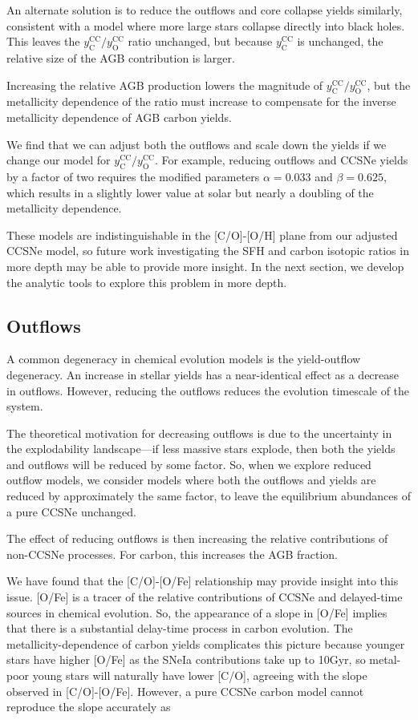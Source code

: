 \documentclass[fleqn,usenatbib]{mnras}
\begin{document}
An alternate solution is to reduce the outflows and core collapse yields similarly, consistent with a model where more large stars collapse directly into black holes. This leaves the $y_\text{C}^\text{CC}/y_\text{O}^\text{CC}$ ratio unchanged, but because $y_\text{C}^\text{CC}$ is unchanged, the relative size of the AGB contribution is larger. 


Increasing the relative AGB production lowers the magnitude of  $y_\text{C}^\text{CC}/y_\text{O}^\text{CC}$, but the metallicity dependence of the ratio must increase to compensate for the inverse metallicity dependence of AGB carbon yields. 

We find that we can adjust both the outflows and scale down the yields if we change our model for $y_\text{C}^\text{CC}/y_\text{O}^\text{CC}$. For example, reducing outflows and CCSNe yields by a factor of two requires the modified parameters
$\alpha = 0.033$ and $\beta = 0.625$, which results in a slightly lower value at solar but nearly a doubling of the metallicity dependence.

These models are indistinguishable in the [C/O]-[O/H] plane from our adjusted CCSNe model, so future work investigating the SFH and carbon isotopic ratios in more depth may be able to provide more insight. In the next section, we develop the analytic tools to explore this problem in more depth. 

\subsection{Outflows}
A common degeneracy in chemical evolution models is the yield-outflow degeneracy. An increase in stellar yields has a near-identical effect as a decrease in outflows. However, reducing the outflows reduces the evolution timescale of the system. 

The theoretical motivation for decreasing outflows is due to the uncertainty in the explodability landscape---if less massive stars explode, then both the yields and outflows will be reduced by some factor. So, when we explore reduced outflow models, we consider models where both the outflows and yields are reduced by approximately the same factor, to leave the equilibrium abundances of a pure CCSNe unchanged. 

The effect of reducing outflows is then increasing the relative contributions of non-CCSNe processes. For carbon, this increases the AGB fraction.

We have found that the [C/O]-[O/Fe] relationship may provide insight into this issue. [O/Fe] is a tracer of the relative contributions of CCSNe and delayed-time sources in chemical evolution. So, the appearance of a slope in [O/Fe] implies that there is a substantial delay-time process in carbon evolution. 
The metallicity-dependence of carbon yields complicates this picture because younger stars have higher [O/Fe] as the SNeIa contributions take up to 10Gyr, so metal-poor young stars will naturally have lower [C/O], agreeing with the slope observed in [C/O]-[O/Fe]. However, a pure CCSNe carbon model cannot reproduce the slope accurately as  
\end{document}
